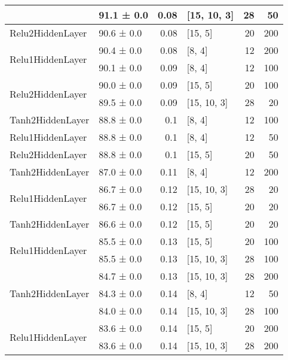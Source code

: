 \begin{table*}[h]
\begin{tabular}{llrlrr}
         & 91.1 ± 0.0 &  0.08 & [15, 10, 3]    &         28 &       50 \\
 \hline
Relu2HiddenLayer         & 90.6 ± 0.0 &  0.08 & [15, 5]        &         20 &      200 \\
 \hline
\multirow{2}{*}{Relu1HiddenLayer}         & 90.4 ± 0.0 &  0.08 & [8, 4]         &         12 &      200 \\
         & 90.1 ± 0.0 &  0.09 & [8, 4]         &         12 &      100 \\
 \hline
\multirow{2}{*}{Relu2HiddenLayer}         & 90.0 ± 0.0 &  0.09 & [15, 5]        &         20 &      100 \\
         & 89.5 ± 0.0 &  0.09 & [15, 10, 3]    &         28 &       20 \\
 \hline
Tanh2HiddenLayer         & 88.8 ± 0.0 &  0.1  & [8, 4]         &         12 &      100 \\
 \hline
Relu1HiddenLayer         & 88.8 ± 0.0 &  0.1  & [8, 4]         &         12 &       50 \\
 \hline
Relu2HiddenLayer         & 88.8 ± 0.0 &  0.1  & [15, 5]        &         20 &       50 \\
 \hline
Tanh2HiddenLayer         & 87.0 ± 0.0 &  0.11 & [8, 4]         &         12 &      200 \\
 \hline
\multirow{2}{*}{Relu1HiddenLayer}         & 86.7 ± 0.0 &  0.12 & [15, 10, 3]    &         28 &       20 \\
         & 86.7 ± 0.0 &  0.12 & [15, 5]        &         20 &       20 \\
 \hline
Tanh2HiddenLayer         & 86.6 ± 0.0 &  0.12 & [15, 5]        &         20 &       20 \\
 \hline
\multirow{2}{*}{Relu1HiddenLayer}         & 85.5 ± 0.0 &  0.13 & [15, 5]        &         20 &      100 \\
         & 85.5 ± 0.0 &  0.13 & [15, 10, 3]    &         28 &      100 \\
 \hline
\multirow{3}{*}{Tanh2HiddenLayer}         & 84.7 ± 0.0 &  0.13 & [15, 10, 3]    &         28 &      200 \\
         & 84.3 ± 0.0 &  0.14 & [8, 4]         &         12 &       50 \\
         & 84.0 ± 0.0 &  0.14 & [15, 10, 3]    &         28 &      100 \\
 \hline
\multirow{2}{*}{Relu1HiddenLayer}         & 83.6 ± 0.0 &  0.14 & [15, 5]        &         20 &      200 \\
         & 83.6 ± 0.0 &  0.14 & [15, 10, 3]    &         28 &      200 \\

\end{tabular}
\end{table*}
